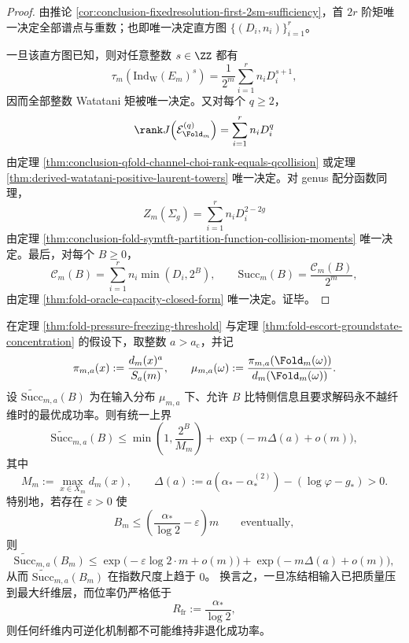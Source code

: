 \begin{proof}
由推论 \ref{cor:conclusion-fixedresolution-first-2sm-sufficiency}，首 \(2r\) 阶矩唯一决定全部谱点与重数；也即唯一决定直方图 \(\{(D_i,n_i)\}_{i=1}^r\)。

一旦该直方图已知，则对任意整数 \(s\in\ZZ\) 都有
\[
\tau_m\!\left(\mathrm{Ind}_{\mathrm W}(E_m)^s\right)
=
\frac1{2^m}\sum_{i=1}^{r}n_iD_i^{s+1},
\]
因而全部整数 Watatani 矩被唯一决定。又对每个 \(q\ge 2\)，
\[
\rank J\!\left(\mathcal E_{\Fold_m}^{(q)}\right)
=
\sum_{i=1}^{r}n_iD_i^q
\]
由定理 \ref{thm:conclusion-qfold-channel-choi-rank-equals-qcollision} 或定理 \ref{thm:derived-watatani-positive-laurent-towers} 唯一决定。对 genus 配分函数同理，
\[
Z_m(\Sigma_g)=\sum_{i=1}^{r}n_iD_i^{2-2g}
\]
由定理 \ref{thm:conclusion-fold-symtft-partition-function-collision-moments} 唯一决定。最后，对每个 \(B\ge 0\)，
\[
\mathcal C_m(B)=\sum_{i=1}^{r}n_i\min(D_i,2^B),
\qquad
\mathrm{Succ}_m(B)=\frac{\mathcal C_m(B)}{2^m},
\]
由定理 \ref{thm:fold-oracle-capacity-closed-form} 唯一决定。证毕。
\end{proof}

\begin{theorem}\label{thm:derived-frozen-escort-sideinfo-linear-threshold}
在定理 \ref{thm:fold-pressure-freezing-threshold} 与定理 \ref{thm:fold-escort-groundstate-concentration} 的假设下，取整数 \(a>a_{\mathrm c}\)，并记
\[
\pi_{m,a}(x):=\frac{d_m(x)^a}{S_a(m)},
\qquad
\mu_{m,a}(\omega):=\frac{\pi_{m,a}(\Fold_m(\omega))}{d_m(\Fold_m(\omega))}.
\]
设 \(\widetilde{\mathrm{Succ}}_{m,a}(B)\) 为在输入分布 \(\mu_{m,a}\) 下、允许 \(B\) 比特侧信息且要求解码永不越纤维时的最优成功率。则有统一上界
\[
\widetilde{\mathrm{Succ}}_{m,a}(B)
\le
\min\!\left(1,\frac{2^B}{M_m}\right)
+
\exp\!\bigl(-m\Delta(a)+o(m)\bigr),
\]
其中
\[
M_m:=\max_{x\in X_m}d_m(x),
\qquad
\Delta(a):=a(\alpha_\ast-\alpha_\ast^{(2)})-(\log\varphi-g_\ast)>0.
\]
特别地，若存在 \(\varepsilon>0\) 使
\[
B_m\le \left(\frac{\alpha_\ast}{\log 2}-\varepsilon\right)m
\qquad\text{eventually},
\]
则
\[
\widetilde{\mathrm{Succ}}_{m,a}(B_m)
\le
\exp\!\bigl(-\varepsilon\log 2\cdot m+o(m)\bigr)
+
\exp\!\bigl(-m\Delta(a)+o(m)\bigr),
\]
从而 \(\widetilde{\mathrm{Succ}}_{m,a}(B_m)\) 在指数尺度上趋于 \(0\)。
换言之，一旦冻结相输入已把质量压到最大纤维层，而位率仍严格低于
\[
R_{\mathrm{fr}}:=\frac{\alpha_\ast}{\log 2},
\]
则任何纤维内可逆化机制都不可能维持非退化成功率。
\end{theorem}


